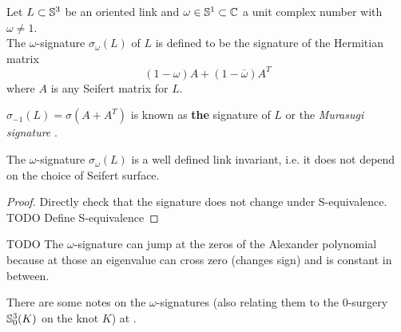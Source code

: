 \begin{definition}
	Let $L \subset \mathbb{S}^{3}$ be an oriented link and
	$\omega \in \mathbb{S}^{1} \subset \mathbb{C}$
	a unit complex number with $\omega \ne 1$. \\
	The $\omega$-signature $\sigma_{\omega}(L)$ of $L$
	is defined to be the signature of the Hermitian matrix
	\begin{equation*}
		(1 - \omega) A + (1 - \overline{\omega}) A^{T}
	\end{equation*}
	where $A$ is any Seifert matrix for $L$.
\end{definition}

\begin{definition}
	$\sigma_{-1}(L) = \sigma(A + A^{T})$
	is known as \textbf{the} signature of $L$
	or the \textit{Murasugi signature} .
\end{definition}

\begin{theorem}
	The $\omega$-signature $\sigma_{\omega}(L)$ is a well defined link invariant,
	i.e. it does not depend on the choice of Seifert surface.
\end{theorem}

\begin{proof}
	Directly check that the signature does not change under S-equivalence.
	TODO Define S-equivalence
\end{proof}

TODO The $\omega$-signature can jump at the zeros of the Alexander polynomial
because at those an eigenvalue can cross zero (changes sign)
and is constant in between.

There are some notes on the $\omega$-signatures
(also relating them to the $0$-surgery $\mathbb{S}^{3}_{0}(K)$
on the knot $K$) at \citep{conway2018notes}.

